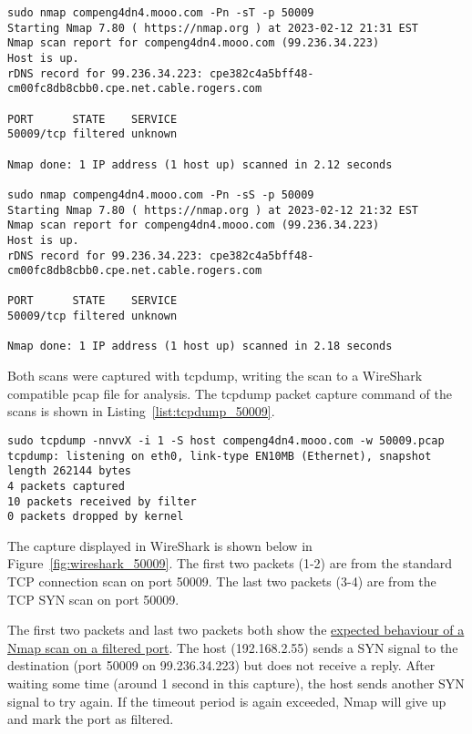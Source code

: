 \begin{lstlisting}[caption=Nmap Scans on Port 50009,label=list:nmap_50009]
sudo nmap compeng4dn4.mooo.com -Pn -sT -p 50009
Starting Nmap 7.80 ( https://nmap.org ) at 2023-02-12 21:31 EST
Nmap scan report for compeng4dn4.mooo.com (99.236.34.223)
Host is up.
rDNS record for 99.236.34.223: cpe382c4a5bff48-cm00fc8db8cbb0.cpe.net.cable.rogers.com

PORT      STATE    SERVICE
50009/tcp filtered unknown

Nmap done: 1 IP address (1 host up) scanned in 2.12 seconds

sudo nmap compeng4dn4.mooo.com -Pn -sS -p 50009
Starting Nmap 7.80 ( https://nmap.org ) at 2023-02-12 21:32 EST
Nmap scan report for compeng4dn4.mooo.com (99.236.34.223)
Host is up.
rDNS record for 99.236.34.223: cpe382c4a5bff48-cm00fc8db8cbb0.cpe.net.cable.rogers.com

PORT      STATE    SERVICE
50009/tcp filtered unknown

Nmap done: 1 IP address (1 host up) scanned in 2.18 seconds
\end{lstlisting}

Both scans were captured with tcpdump, writing the scan to a WireShark compatible pcap file for analysis. The tcpdump packet capture command of the scans is shown in Listing~\ref{list:tcpdump_50009}. 

\begin{lstlisting}[caption=Tcpdump Packet Capture of Scans on Port 50009,label=list:tcpdump_50009]
sudo tcpdump -nnvvX -i 1 -S host compeng4dn4.mooo.com -w 50009.pcap
tcpdump: listening on eth0, link-type EN10MB (Ethernet), snapshot length 262144 bytes
4 packets captured
10 packets received by filter
0 packets dropped by kernel
\end{lstlisting}

The capture displayed in WireShark is shown below in Figure~\ref{fig:wireshark_50009}. The first two packets (1-2) are from the standard TCP connection scan on port 50009. The last two packets (3-4) are from the TCP SYN scan on port 50009.

The first two packets and last two packets both show the \href{https://nmap.org/book/synscan.html#scan-methods-fig-syn-scan-filtered}{expected behaviour of a Nmap scan on a filtered port}. The host (192.168.2.55) sends a SYN signal to the destination (port 50009 on 99.236.34.223) but does not receive a reply. After waiting some time (around 1 second in this capture), the host sends another SYN signal to try again. If the timeout period is again exceeded, Nmap will give up and mark the port as filtered.

